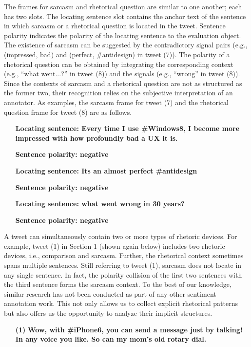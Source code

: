 \documentclass[english]{jnlp_1.4}
\begin{document}
The frames for sarcasm and rhetorical question are similar to one another; each has two slots. The locating sentence slot contains the anchor text of the sentence in which sarcasm or a rhetorical question is located in the tweet. Sentence polarity indicates the polarity of the locating sentence to the evaluation object. The existence of sarcasm can be suggested by the contradictory signal pairs (e.g., (impressed, bad) and (perfect, \#antidesign) in tweet (7)). The polarity of a rhetorical question can be obtained by integrating the corresponding context (e.g., ``what went...?'' in tweet (8)) and the signals (e.g., ``wrong'' in tweet (8)). Since the contexts of sarcasm and a rhetorical question are not as structured as the former two, their recognition relies on the subjective interpretation of an annotator. As examples, the sarcasm frame for tweet (7) and the rhetorical question frame for tweet (8) are as follows.

\vspace{0.5\Cvs}
\begin{itemize}
\item[] {\bf Locating sentence: Every time I use \#Windows8, I become more impressed with how profoundly bad a UX it is.}
\item[] {\bf Sentence polarity: negative}
\end{itemize}
\begin{itemize}
\item[] {\bf Locating sentence: Its an almost perfect \#antidesign}
\item[] {\bf Sentence polarity: negative}
\end{itemize}
\vspace{0.5\Cvs}

\begin{itemize}
\item[] {\bf Locating sentence: what went wrong in 30 years?}
\item[] {\bf Sentence polarity: negative}
\end{itemize}
\vspace{0.5\Cvs}

A tweet can simultaneously contain two or more types of rhetoric devices. For example, tweet (1) in Section 1 (shown again below) includes two rhetoric devices, i.e., comparison and sarcasm. Further, the rhetorical context sometimes spans multiple sentences. Still referring to tweet (1), sarcasm does not locate in any single sentence. In fact, the polarity collision of the first two sentences with the third sentence forms the sarcasm context. To the best of our knowledge, similar research has not been conducted as part of any other sentiment annotation work. This not only allows us to collect explicit rhetorical patterns but also offers us the opportunity to analyze their implicit structures.
\begin{enumerate}
\item[{\bf (1)}] {\bf Wow, with \#iPhone6, you can send a message just by talking! In any voice you like. So can my mom's old rotary dial.}
\end{enumerate}
\end{document}
